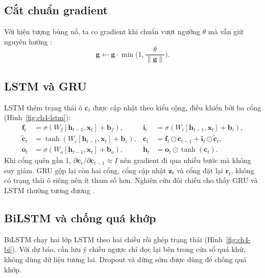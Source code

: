 
\subsection{Cắt chuẩn gradient}
Với hiện tượng bùng nổ, ta co gradient khi chuẩn vượt ngưỡng $\theta$ mà vẫn giữ nguyên hướng \cite{ch4:pascanu2013}:
\begin{equation}
  \mathbf{g}\leftarrow\mathbf{g}\cdot\min\!\Big(1,\frac{\theta}{\|\mathbf{g}\|}\Big).
\end{equation}

\subsection{LSTM và GRU}
LSTM \cite{ch1:hochreiter1997,ch4:gers2000} thêm trạng thái ô $\mathbf{c}_t$ được cập nhật theo kiểu cộng, điều khiển bởi ba cổng (Hình~\ref{fig:ch4-lstm}):
\begin{align}
  \mathbf{f}_t&=\sigma(W_f[\mathbf{h}_{t-1},\mathbf{x}_t]+\mathbf{b}_f), &
  \mathbf{i}_t&=\sigma(W_i[\mathbf{h}_{t-1},\mathbf{x}_t]+\mathbf{b}_i),\\
  \tilde{\mathbf{c}}_t&=\tanh(W_c[\mathbf{h}_{t-1},\mathbf{x}_t]+\mathbf{b}_c), &
  \mathbf{c}_t&=\mathbf{f}_t\odot\mathbf{c}_{t-1}+\mathbf{i}_t\odot\tilde{\mathbf{c}}_t,\\
  \mathbf{o}_t&=\sigma(W_o[\mathbf{h}_{t-1},\mathbf{x}_t]+\mathbf{b}_o), &
  \mathbf{h}_t&=\mathbf{o}_t\odot\tanh(\mathbf{c}_t).
\end{align}
Khi cổng quên gần 1, $\partial\mathbf{c}_t/\partial\mathbf{c}_{t-1}\approx I$ nên gradient đi qua nhiều bước mà không suy giảm. GRU \cite{ch4:cho2014,ch4:chung2014} gộp lại còn hai cổng, cổng cập nhật $\mathbf{z}_t$ và cổng đặt lại $\mathbf{r}_t$, không có trạng thái ô riêng nên ít tham số hơn.
Nghiên cứu đối chiếu cho thấy GRU và LSTM thường tương đương \cite{ch4:chung2014}.


\subsection{BiLSTM và chống quá khớp}
BiLSTM \cite{ch4:schuster1997,ch4:graves2013} chạy hai lớp LSTM theo hai chiều rồi ghép trạng thái (Hình~\ref{fig:ch4-bi}). Với dự báo, cần lưu ý chiều ngược chỉ đọc lại bên trong cửa sổ quá khứ, không dùng dữ liệu tương lai. Dropout \cite{ch2:srivastava2014} và dừng sớm được dùng để chống quá khớp.

